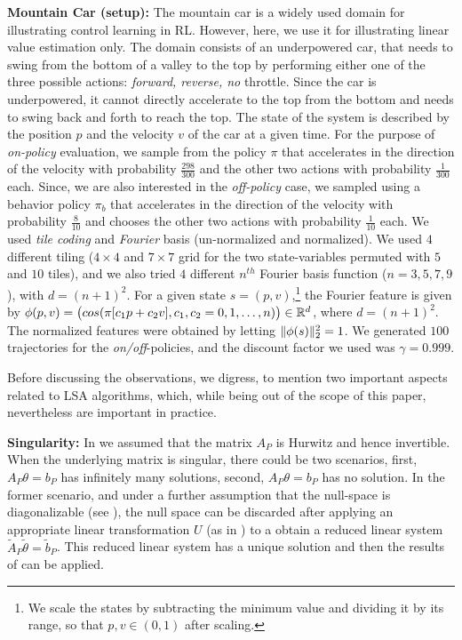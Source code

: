 \textbf{Mountain Car (setup):}  The mountain car is a widely used domain for illustrating control learning in RL.
However, here, we use it for illustrating linear value estimation only. The domain consists of an underpowered car, that needs to swing from the bottom of a valley to the top by performing either one of the three possible actions: \emph{forward, reverse, no} throttle. Since the car is underpowered, it cannot directly accelerate to the top from the bottom and needs to swing back and forth to reach the top. The state of the system is described by the position $p$ and the velocity $v$ of the car at a given time. For the purpose of \emph{on-policy} evaluation, we sample from the policy $\pi$ that accelerates in the direction of the velocity with probability $\frac{298}{300}$ and the other two actions with probability $\frac{1}{300}$ each. Since, we are also interested in the \emph{off-policy} case, we sampled using a behavior policy $\pi_b$ that accelerates in the direction of the velocity with probability $\frac{8}{10}$ and chooses the other two actions with probability $\frac{1}{10}$ each. We used \emph{tile coding} and \emph{Fourier} basis (un-normalized and normalized). We used $4$ different tiling ($4\times 4$ and $7\times 7$ grid for the two state-variables permuted with $5$ and $10$ tiles), and we also tried $4$ different $n^{th}$ Fourier basis function ($n=3,5,7,9$), with $d=(n+1)^2$. For a given state $s=(p,v)$,\footnote{We scale the states by subtracting the minimum value and dividing it by its range, so that $p,v\in(0,1)$ after scaling.} the Fourier feature is given by $\phi(p,v)=\big(cos(\pi [c_1p+c_2 v],c_1,c_2=0,1,\ldots,n)\big) \in \mathbb{R}^{d}$, where $d=(n+1)^2$. The normalized features were obtained by letting $\| \phi(s)\|^2_2=1$. We generated $100$ trajectories for the \emph{on/off}-policies, and the discount factor we used was $\gamma=0.999$. 

Before discussing the observations, we digress, to mention two important aspects related to LSA algorithms, which, while being out of the scope of this paper, nevertheless are important in practice.

\textbf{Singularity:} In  we assumed that the matrix $A_P$ is Hurwitz and hence invertible. When the underlying matrix is singular, there could be two scenarios, first,  $A_P\theta=b_P$ has infinitely many solutions, second, $A_P\theta=b_P$ has no solution. In the former scenario, and under a further assumption that the null-space is diagonalizable (see \cite{bertstab}), the null space can be discarded after applying an appropriate linear transformation $U$ (as in ) to a obtain a reduced linear system $\tilde{A}_P\tilde{\theta}=\tilde{b}_P$. This reduced linear system has a unique solution and then the results of  can be applied.


